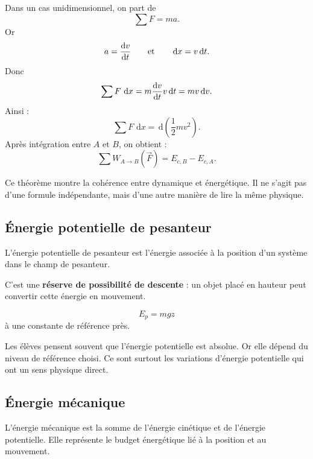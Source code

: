 \documentclass[11pt,a4paper]{article}
\newcommand{\dd}{\,\mathrm{d}}
\begin{document}
\begin{demo}
Dans un cas unidimensionnel, on part de
\[
\sum F = ma.
\]
Or
\[
a=\dv{v}{t}
\qquad \text{et} \qquad
\dd x = v\dd t.
\]
Donc
\[
\sum F\,\dd x = m\dv{v}{t}v\dd t = mv\dd v.
\]
Ainsi :
\[
\sum F\,\dd x = \dd\left(\frac12 mv^2\right).
\]
Après intégration entre \(A\) et \(B\), on obtient :
\[
\sum W_{A\to B}(\vec F)=E_{c,B}-E_{c,A}.
\]
\end{demo}

\begin{modele}
Ce théorème montre la cohérence entre dynamique et énergétique.
Il ne s'agit pas d'une formule indépendante, mais d'une autre manière de lire la même physique.
\end{modele}

\subsection{Énergie potentielle de pesanteur}

\begin{sens}
L'énergie potentielle de pesanteur est l'énergie associée à la position d'un système dans le champ de pesanteur.
\end{sens}

\begin{imagem}
C'est une \textbf{réserve de possibilité de descente} :
un objet placé en hauteur peut convertir cette énergie en mouvement.
\end{imagem}

\begin{bilan}
\[
E_p = mgz
\]
à une constante de référence près.
\end{bilan}

\begin{fausseintuition}
Les élèves pensent souvent que l'énergie potentielle est absolue.
Or elle dépend du niveau de référence choisi.
Ce sont surtout les variations d'énergie potentielle qui ont un sens physique direct.
\end{fausseintuition}

\subsection{Énergie mécanique}

\begin{sens}
L'énergie mécanique est la somme de l'énergie cinétique et de l'énergie potentielle.
Elle représente le budget énergétique lié à la position et au mouvement.
\end{sens}
\end{document}
